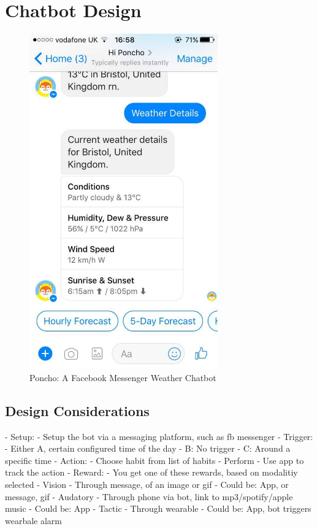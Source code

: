
\newpage
\section{Chatbot Design}


\begin{figure}[ht] %
    \centering
    \includegraphics[width=3.2in]{../resources/poncho.jpg}
    \caption{Poncho: A Facebook Messenger Weather Chatbot}
    \label{fig:poncho}
\end{figure}

  \subsection{Design Considerations}
    - Setup:
      - Setup the bot via a messaging platform, such as fb messenger
    - Trigger:
        - Either A, certain configured time of the day
        -        B: No trigger
        -        C: Around a specific time
    - Action:
      - Choose habit from list of habits
      - Perform
      - Use app to track the action
    - Reward:
      - You get one of these rewards, based on modalitiy selected
      - Vision
        - Through message, of an image or gif
        - Could be: App, or message, gif
      - Audatory
        - Through phone via bot, link to mp3/spotify/apple music
        - Could be: App
      - Tactic
        - Through wearable
        - Could be: App, bot triggers wearbale alarm



